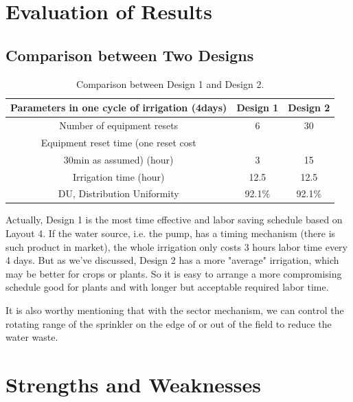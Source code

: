 \documentclass[12pt,a4paper,titlepage]{article}
\begin{document}
\section{Evaluation of Results}

\subsection{Comparison between Two Designs}

\begin{table}[!htb] \centering \caption{Comparison between Design 1 and Design 2.}
\begin{tabular}{lll}
\hline
\multicolumn{1}{c}{Parameters in one cycle of irrigation (4days) } & \multicolumn{1}{c}{Design 1} & \multicolumn{1}{c}{Design 2} \\
\hline
\multicolumn{1}{c}{Number of equipment resets } & \multicolumn{1}{c}{6} & \multicolumn{1}{c}{30} \\
\multicolumn{1}{c}{Equipment reset time (one reset cost} & \multicolumn{1}{c}{} & \multicolumn{1}{c}{} \\
\multicolumn{1}{c}{ 30min as assumed) (hour)} & \multicolumn{1}{c}{3} & \multicolumn{1}{c}{15} \\
\multicolumn{1}{c}{Irrigation time (hour)} & \multicolumn{1}{c}{12.5} & \multicolumn{1}{c}{12.5} \\
\multicolumn{1}{c}{DU, Distribution Uniformity} & \multicolumn{1}{c}{92.1\%} & \multicolumn{1}{c}{92.1\%} \\
\hline
\end{tabular}
\end{table}

Actually, Design 1 is the most time effective and labor saving
schedule based on Layout 4. If the water source, i.e. the pump,
has a timing mechanism (there is such product in market), the
whole irrigation only costs 3 hours labor time every 4 days. But
as we've discussed, Design 2 has a more "average" irrigation,
which may be better for crops or plants. So it is easy to arrange
a more compromising schedule good for plants and with longer but
acceptable required labor time.

It is also worthy mentioning that with the sector mechanism, we
can control the rotating range of the sprinkler on the edge of or
out of the field to reduce the water waste.

\section{Strengths and Weaknesses}
\end{document}
